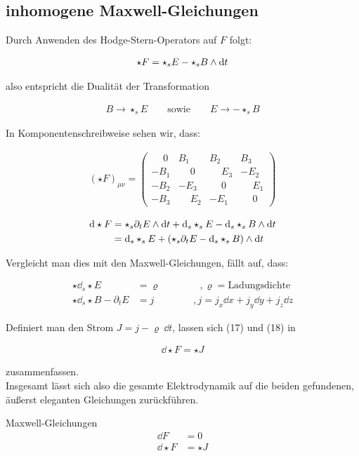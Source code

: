 \subsection{inhomogene Maxwell-Gleichungen}
Durch Anwenden des Hodge-Stern-Operators auf $F$ folgt:

\begin{align}
\star F = \star_s E - \star_s B \wedge \dd t 
\end{align}

also entspricht die Dualität der Transformation 

\begin{align*}
B \rightarrow \star_s E \qquad \text{sowie} \qquad E \rightarrow - \star_s B
\end{align*}

In Komponentenschreibweise sehen wir, dass:

\begin{align}
(\star F)_{\mu \nu} =
\begin{pmatrix}
\phantom{-}0 & B_1 & B_2 & B_3 \\
-B_1 & \phantom{-}0 & \phantom{-}E_3 & -E_2 \\
-B_2 & -E_3 & \phantom{-}0 & \phantom{-}E_1 \\
-B_3 & \phantom{-}E_2 & -E_1 & \phantom{-}0
\end{pmatrix}
\end{align}



\begin{align}
\dd \star F &= \star_s \partial_t E  \wedge \dd t + \dd_s \star_s E - \dd_s \star_s B \wedge \dd t \notag \\
				&= \dd_s \star_s E + (\star_s \partial_t E - \dd_s \star_s B) \wedge \dd t 
\end{align}

Vergleicht man dies mit den Maxwell-Gleichungen, fällt auf, dass:

\begin{align}
\star \dd_s \star E &= \varrho \qquad\qquad,\varrho=\text{Ladungsdichte} \\
\star \dd_s\star B - \partial_t E &= j \qquad\qquad ,j=j_x \dd x + j_y \dd y + j_z \dd z
\end{align}

Definiert man den Strom $J=j - \varrho \  \dd t$, lassen sich (17) und (18) in 

\begin{align}
\dd \star F = \star J
\end{align}

zusammenfassen. \\

Insgesamt lässt sich also die gesamte Elektrodynamik auf die beiden gefundenen, äußerst eleganten Gleichungen zurückführen.

\begin{mybox}{Maxwell-Gleichungen}
\begin{align*}
\dd F &= 0 \\
\dd \star F &= \star J
\end{align*}
\end{mybox}
